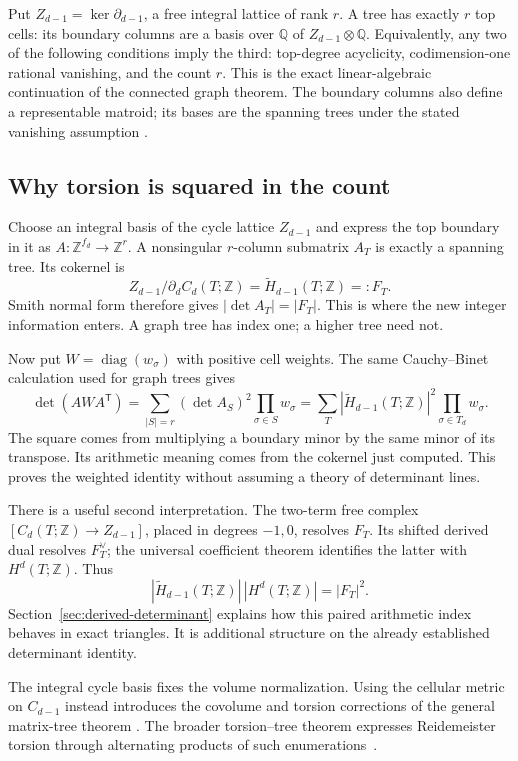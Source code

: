 \documentclass[11pt]{article}
\theoremstyle{definition}
\theoremstyle{remark}
\newcommand{\Q}{\mathbb Q}
\newcommand{\Z}{\mathbb Z}
\begin{document}
Put \(Z_{d-1}=\ker\partial_{d-1}\), a free integral lattice of rank
\(r\).  A tree has exactly \(r\) top cells: its boundary columns are a
basis over \(\Q\) of \(Z_{d-1}\otimes\Q\).  Equivalently, any two of
the following conditions imply the third: top-degree acyclicity,
codimension-one rational vanishing, and the count \(r\).  This is the
exact linear-algebraic continuation of the connected graph theorem.
The boundary columns also define a representable matroid; its bases are
the spanning trees under the stated vanishing assumption
\cite{gih-dkm-trees}.

\subsection{Why torsion is squared in the count}

Choose an integral basis of the cycle lattice $Z_{d-1}$ and express the top boundary in it as $A:\Z^{f_d}\to\Z^r$. A nonsingular $r$-column submatrix $A_T$ is exactly a spanning tree. Its cokernel is
\[
 Z_{d-1}/\partial_d C_d(T;\Z)
 =\widetilde H_{d-1}(T;\Z)=:F_T.
\]
Smith normal form therefore gives $|\det A_T|=|F_T|$. This is where the new integer information enters. A graph tree has index one; a higher tree need not.

Now put $W=\operatorname{diag}(w_\sigma)$ with positive cell weights. The same Cauchy--Binet calculation used for graph trees gives
\begin{equation}\label{eq:gih-higher-cb}
 \det(AWA^{\mathsf T})
 =\sum_{|S|=r}(\det A_S)^2\prod_{\sigma\in S}w_\sigma
 =\sum_T|\widetilde H_{d-1}(T;\Z)|^2
                  \prod_{\sigma\in T_d}w_\sigma.
\end{equation}
The square comes from multiplying a boundary minor by the same minor of its transpose. Its arithmetic meaning comes from the cokernel just computed. This proves the weighted identity without assuming a theory of determinant lines.

There is a useful second interpretation. The two-term free complex
$[C_d(T;\Z)\to Z_{d-1}]$, placed in degrees $-1,0$, resolves $F_T$.
Its shifted derived dual resolves $F_T^\vee$; the universal coefficient theorem identifies the latter with $H^d(T;\Z)$. Thus
\[
 |\widetilde H_{d-1}(T;\Z)|\,|H^d(T;\Z)|=|F_T|^2.
\]
Section~\ref{sec:derived-determinant} explains how this paired arithmetic index behaves in exact triangles. It is additional structure on the already established determinant identity.

The integral cycle basis fixes the volume normalization. Using the
cellular metric on \(C_{d-1}\) instead introduces the covolume and
torsion corrections of the general matrix-tree theorem
\cite{gih-dkm-matrix,derived-catanzaro-chernyak-klein}. The broader
torsion--tree theorem expresses Reidemeister torsion through alternating
products of such enumerations~\cite{derived-catanzaro-chernyak-klein}.
\end{document}
